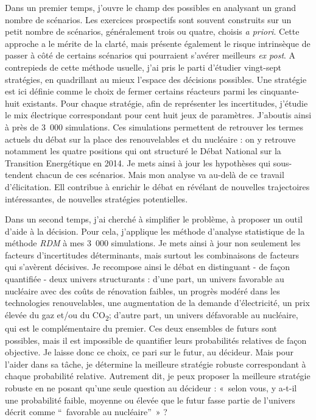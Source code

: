 Dans un premier temps, j'ouvre le champ des possibles en analysant un grand nombre de scénarios. Les exercices prospectifs sont souvent construits sur un petit nombre de scénarios, généralement trois ou quatre, choisis \textit{a priori}. Cette approche a le mérite de la clarté, mais présente également le risque intrinsèque de passer à côté de certains scénarios qui pourraient s'avérer meilleurs \textit{ex post}.
A contrepieds de cette méthode usuelle, j'ai pris le parti d'étudier vingt-sept stratégies, en quadrillant au mieux l'espace des décisions possibles. Une stratégie est ici définie comme le choix de fermer certains réacteurs parmi les cinquante-huit existants. Pour chaque stratégie, afin de représenter les incertitudes, j'étudie le mix électrique correspondant pour cent huit jeux de paramètres. J'aboutis ainsi à près de 3~000 simulations.
Ces simulations permettent de retrouver les termes actuels du débat sur la place des renouvelables et du nucléaire : on y retrouve notamment les quatre positions qui ont structuré le Débat National sur la Transition Energétique en 2014. 
Je mets ainsi à jour les hypothèses qui sous-tendent chacun de ces scénarios. 
Mais mon analyse va au-delà de ce travail d'élicitation. Ell contribue à enrichir le débat en révélant de nouvelles trajectoires intéressantes, de nouvelles stratégies potentielles. 

Dans un second temps, j'ai cherché à simplifier le problème, à proposer un outil d'aide à la décision. 
Pour cela, j'applique les méthode d'analyse statistique de la méthode \textit{RDM} à mes 3~000 simulations. Je mets ainsi à jour non seulement les facteurs d'incertitudes déterminants, mais surtout les combinaisons de facteurs qui s'avèrent décisives.
Je recompose ainsi le débat en distinguant - de façon quantifiée - deux univers structurants : d'une part, un univers favorable au nucléaire avec des coûts de rénovation faibles, un progrès modéré dans les technologies renouvelables, une augmentation de la demande d'électricité, un prix élevée du gaz et/ou du CO\textsubscript{2}; d'autre part, un univers défavorable au nucléaire, qui est le complémentaire du premier.
Ces deux ensembles de futurs sont possibles, mais il est impossible de quantifier leurs probabilités relatives de façon objective. Je laisse donc ce choix, ce pari sur le futur, au décideur. 
Mais pour l'aider dans sa tâche, je détermine la meilleure stratégie robuste correspondant à chaque probabilité relative. Autrement dit, je peux proposer la meilleure stratégie robuste en ne posant qu'une seule question au décideur : «~selon vous, y a-t-il une probabilité faible, moyenne ou élevée que le futur fasse partie de l'univers décrit comme “~favorable au nucléaire”~» ?
 
